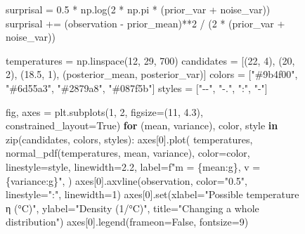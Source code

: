\documentclass[
  letterpaper,
  DIV=11,
  numbers=noendperiod]{scrreprt}
\newenvironment{Shaded}{\begin{snugshade}}{\end{snugshade}}
\newcommand{\BuiltInTok}[1]{\textcolor[rgb]{0.00,0.23,0.31}{#1}}
\newcommand{\ControlFlowTok}[1]{\textcolor[rgb]{0.00,0.23,0.31}{\textbf{#1}}}
\newcommand{\DecValTok}[1]{\textcolor[rgb]{0.68,0.00,0.00}{#1}}
\newcommand{\FloatTok}[1]{\textcolor[rgb]{0.68,0.00,0.00}{#1}}
\newcommand{\KeywordTok}[1]{\textcolor[rgb]{0.00,0.23,0.31}{\textbf{#1}}}
\newcommand{\NormalTok}[1]{\textcolor[rgb]{0.00,0.23,0.31}{#1}}
\newcommand{\OperatorTok}[1]{\textcolor[rgb]{0.37,0.37,0.37}{#1}}
\newcommand{\SpecialCharTok}[1]{\textcolor[rgb]{0.37,0.37,0.37}{#1}}
\newcommand{\SpecialStringTok}[1]{\textcolor[rgb]{0.13,0.47,0.30}{#1}}
\newcommand{\StringTok}[1]{\textcolor[rgb]{0.13,0.47,0.30}{#1}}
\newcommand{\VariableTok}[1]{\textcolor[rgb]{0.07,0.07,0.07}{#1}}
\begin{document}
\begin{figure}
{\begin{Shaded}
\begin{Highlighting}[]
\NormalTok{surprisal }\OperatorTok{=} \FloatTok{0.5} \OperatorTok{*}\NormalTok{ np.log(}\DecValTok{2} \OperatorTok{*}\NormalTok{ np.pi }\OperatorTok{*}\NormalTok{ (prior\_var }\OperatorTok{+}\NormalTok{ noise\_var))}
\NormalTok{surprisal }\OperatorTok{+=}\NormalTok{ (observation }\OperatorTok{{-}}\NormalTok{ prior\_mean)}\OperatorTok{**}\DecValTok{2} \OperatorTok{/}\NormalTok{ (}\DecValTok{2} \OperatorTok{*}\NormalTok{ (prior\_var }\OperatorTok{+}\NormalTok{ noise\_var))}

\NormalTok{temperatures }\OperatorTok{=}\NormalTok{ np.linspace(}\DecValTok{12}\NormalTok{, }\DecValTok{29}\NormalTok{, }\DecValTok{700}\NormalTok{)}
\NormalTok{candidates }\OperatorTok{=}\NormalTok{ [(}\DecValTok{22}\NormalTok{, }\DecValTok{4}\NormalTok{), (}\DecValTok{20}\NormalTok{, }\DecValTok{2}\NormalTok{), (}\FloatTok{18.5}\NormalTok{, }\DecValTok{1}\NormalTok{), (posterior\_mean, posterior\_var)]}
\NormalTok{colors }\OperatorTok{=}\NormalTok{ [}\StringTok{"\#9b4f00"}\NormalTok{, }\StringTok{"\#6d55a3"}\NormalTok{, }\StringTok{"\#2879a8"}\NormalTok{, }\StringTok{"\#087f5b"}\NormalTok{]}
\NormalTok{styles }\OperatorTok{=}\NormalTok{ [}\StringTok{"{-}{-}"}\NormalTok{, }\StringTok{"{-}."}\NormalTok{, }\StringTok{":"}\NormalTok{, }\StringTok{"{-}"}\NormalTok{]}

\NormalTok{fig, axes }\OperatorTok{=}\NormalTok{ plt.subplots(}\DecValTok{1}\NormalTok{, }\DecValTok{2}\NormalTok{, figsize}\OperatorTok{=}\NormalTok{(}\DecValTok{11}\NormalTok{, }\FloatTok{4.3}\NormalTok{), constrained\_layout}\OperatorTok{=}\VariableTok{True}\NormalTok{)}
\ControlFlowTok{for}\NormalTok{ (mean, variance), color, style }\KeywordTok{in} \BuiltInTok{zip}\NormalTok{(candidates, colors, styles):}
\NormalTok{    axes[}\DecValTok{0}\NormalTok{].plot(}
\NormalTok{        temperatures, normal\_pdf(temperatures, mean, variance),}
\NormalTok{        color}\OperatorTok{=}\NormalTok{color, linestyle}\OperatorTok{=}\NormalTok{style, linewidth}\OperatorTok{=}\FloatTok{2.2}\NormalTok{,}
\NormalTok{        label}\OperatorTok{=}\SpecialStringTok{f"m = }\SpecialCharTok{\{}\NormalTok{mean}\SpecialCharTok{:g\}}\SpecialStringTok{, v = }\SpecialCharTok{\{}\NormalTok{variance}\SpecialCharTok{:g\}}\SpecialStringTok{"}\NormalTok{,}
\NormalTok{    )}
\NormalTok{axes[}\DecValTok{0}\NormalTok{].axvline(observation, color}\OperatorTok{=}\StringTok{"0.5"}\NormalTok{, linestyle}\OperatorTok{=}\StringTok{":"}\NormalTok{, linewidth}\OperatorTok{=}\DecValTok{1}\NormalTok{)}
\NormalTok{axes[}\DecValTok{0}\NormalTok{].}\BuiltInTok{set}\NormalTok{(xlabel}\OperatorTok{=}\StringTok{"Possible temperature η (°C)"}\NormalTok{, ylabel}\OperatorTok{=}\StringTok{"Density (1/°C)"}\NormalTok{,}
\NormalTok{            title}\OperatorTok{=}\StringTok{"Changing a whole distribution"}\NormalTok{)}
\NormalTok{axes[}\DecValTok{0}\NormalTok{].legend(frameon}\OperatorTok{=}\VariableTok{False}\NormalTok{, fontsize}\OperatorTok{=}\DecValTok{9}\NormalTok{)}


\end{Highlighting}
\end{Shaded}}
\end{figure}
\end{document}
